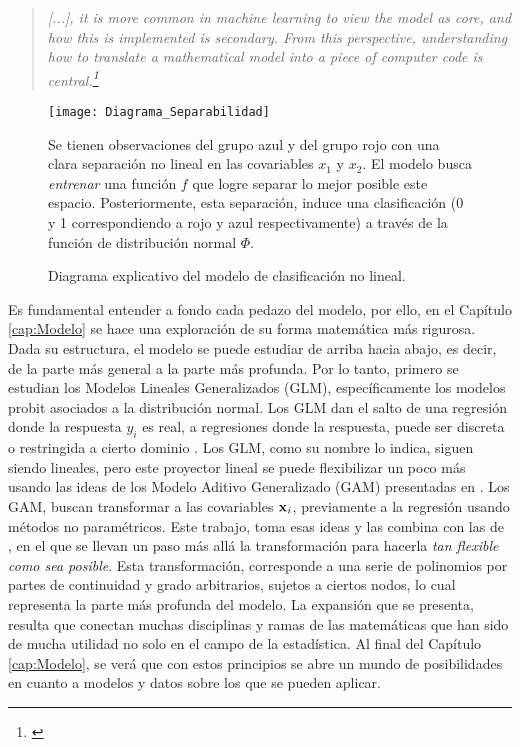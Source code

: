 \documentclass[../Main/Main.tex]{subfiles}
\begin{document}
\begin{quote}
	\textit{[...], it is more common in machine learning to view the model as core, and how this is implemented
is secondary. From this perspective, understanding how to translate a mathematical model into a piece of
computer code is central.\footnote{\citet{barber2012bayesian}}}
\end{quote}

\begin{figure}[h]
  \centering
      \texttt{[image: Diagrama\_Separabilidad]}
  \caption{Diagrama explicativo del modelo de clasificación no lineal.}
  \label{fig:DiagramaIntro}

  \medskip
  \begin{flushleft}
  \small
   Se tienen observaciones del grupo azul y del grupo rojo con una 	clara separación no lineal en las covariables $x_1$ y $x_2$. El modelo busca \textit{entrenar} una función $f$ que logre separar lo mejor posible este espacio. Posteriormente, esta separación, induce una clasificación (0 y 1 correspondiendo a rojo y azul respectivamente) a través de la función de distribución normal $\Phi$.
	\end{flushleft}  
\end{figure}

Es fundamental entender a fondo cada pedazo del modelo, por ello, en el Capítulo \ref{cap:Modelo} se hace una exploración de su forma matemática más rigurosa. Dada su estructura, el modelo  se puede estudiar de arriba hacia abajo, es decir, de la parte más general a la parte más profunda. Por lo tanto, primero se estudian los Modelos Lineales Generalizados (GLM), específicamente los modelos probit asociados a la distribución normal. Los GLM dan el salto de una regresión donde la respuesta $y_i$ es real, a regresiones donde la respuesta, puede ser discreta o restringida a cierto dominio \autocite{maccullagh1989generalized}. Los GLM, como su nombre lo indica, siguen siendo lineales, pero este proyector lineal se puede flexibilizar un poco más usando las ideas de los Modelo Aditivo Generalizado (GAM) presentadas en \citet{hastie1986generalized}. Los GAM, buscan transformar a las covariables $\mathbf{x}_i$, previamente a la regresión usando métodos no paramétricos. Este trabajo, toma esas ideas y las combina con las de \citet{mallik1998automatic}, en el que se llevan un paso más allá la transformación para hacerla \textit{tan flexible como sea posible}. Esta transformación, corresponde a una serie de polinomios por partes de continuidad y grado arbitrarios, sujetos a ciertos nodos, lo cual representa la parte más profunda del modelo. La expansión que se presenta, resulta que conectan muchas disciplinas y ramas de las matemáticas que han sido de mucha utilidad no solo en el campo de la estadística. Al final del Capítulo \ref{cap:Modelo}, se verá que con estos principios se abre un mundo de posibilidades en cuanto a modelos y datos sobre los que se pueden aplicar.
\end{document}
